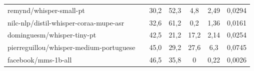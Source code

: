\documentclass{IEEEphot}
\begin{document}
\begin{table}[t]
\begin{tabular}{lcccccc}
\multicolumn{1}{|l|}{remynd/whisper-small-pt}                  & \multicolumn{1}{c|}{}                                                                                                                 & \multicolumn{1}{c|}{30,2}                            & \multicolumn{1}{c|}{52,3}                                                                        & \multicolumn{1}{c|}{4,8}                                                                & \multicolumn{1}{c|}{2,49}                             & \multicolumn{1}{c|}{0,0294}                              \\
\multicolumn{1}{|l|}{nilc-nlp/distil-whisper-coraa-mupe-asr}   & \multicolumn{1}{c|}{}                                                                                                                 & \multicolumn{1}{c|}{32,6}                            & \multicolumn{1}{c|}{61,2}                                                                        & \multicolumn{1}{c|}{0,2}                                                                & \multicolumn{1}{c|}{1,36}                             & \multicolumn{1}{c|}{0,0161}                              \\
\multicolumn{1}{|l|}{dominguesm/whisper-tiny-pt}               & \multicolumn{1}{c|}{}                                                                                                                 & \multicolumn{1}{c|}{42,5}                            & \multicolumn{1}{c|}{21,2}                                                                        & \multicolumn{1}{c|}{17,2}                                                               & \multicolumn{1}{c|}{2,14}                             & \multicolumn{1}{c|}{0,0254}                              \\
\multicolumn{1}{|l|}{pierreguillou/whisper-medium-portuguese}  & \multicolumn{1}{c|}{}                                                                                                                 & \multicolumn{1}{c|}{45,0}                            & \multicolumn{1}{c|}{29,2}                                                                        & \multicolumn{1}{c|}{27,6}                                                               & \multicolumn{1}{c|}{6,3}                              & \multicolumn{1}{c|}{0,0745}                              \\
\multicolumn{1}{|l|}{facebook/mms-1b-all}                      & \multicolumn{1}{c|}{}                                                                                                                 & \multicolumn{1}{c|}{46,5}                            & \multicolumn{1}{c|}{35,8}                                                                        & \multicolumn{1}{c|}{0}                                                                  & \multicolumn{1}{c|}{0,22}                             & \multicolumn{1}{c|}{0,0026}                              \\ \hline

\end{tabular}
\end{table}
\end{document}
